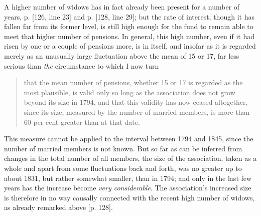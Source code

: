 A higher number of widows has in fact already been present for a number of years, p. [126, line 23] and
p. [128, line 29]; but the rate of interest, though it has fallen far from its former level, is still high enough for the fund to remain able to meet that higher number of pensions. In general, this high number, even if it had risen by one or a couple of pensions more, is in itself, and insofar as it is regarded merely as an unusually large fluctuation above the mean of 15 or 17, far less serious than \textit{the} circumstance to which I now turn
\begin{quote}
that the mean number of pensions, whether 15 or 17 is regarded as the most plausible, is valid only so long as the association does not grow beyond its size in 1794, and that this validity has now ceased altogether, since its size, measured by the number of married members, is more than 60 per cent greater than at that date.
\end{quote}
\noindent\hspace*{\parindent}This measure cannot be applied to the interval between 1794 and 1845, since the number of married members is not known. But so far as can be inferred from changes in the total number of all members, the size of the association, taken as a whole and apart from some fluctuations back and forth, was no greater up to about 1831, but rather somewhat smaller, than in 1794; and only in the last few years has the increase become \textit{very considerable}. The association's increased size is therefore in no way causally connected with the recent high number of widows, as already remarked above [p. 128].

